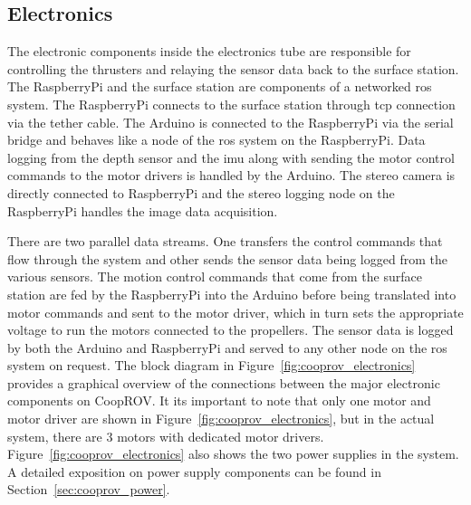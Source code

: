 \documentclass {udthesis}
\begin{document}
\subsection{Electronics}

The electronic components inside the electronics tube are responsible for controlling the thrusters and relaying the sensor data back to the surface station. The RaspberryPi and the surface station are components of a networked \gls{ros} system. The RaspberryPi connects to the surface station through \gls{tcp} connection via the tether cable. The Arduino is connected to the RaspberryPi via the serial bridge and behaves like a node of the \gls{ros} system on the RaspberryPi. Data logging from the depth sensor and the \gls{imu} along with sending the motor control commands to the motor drivers is handled by the Arduino. The stereo camera is directly connected to RaspberryPi and the stereo logging node on the RaspberryPi handles the image data acquisition.

There are two parallel data streams. One transfers the control commands that flow through the system and other sends the sensor data being logged from the various sensors. The motion control commands that come from the surface station are fed by the RaspberryPi into the Arduino before being translated into motor commands and sent to the motor driver, which in turn sets the appropriate voltage to run the motors connected to the propellers. The sensor data is logged by both the Arduino and RaspberryPi and served to any other node on the \gls{ros} system on request. The block diagram in Figure~\ref{fig:cooprov_electronics} provides a graphical overview of the connections between the major electronic components on CoopROV. It its important to note that only one motor and motor driver are shown in Figure~\ref{fig:cooprov_electronics}, but in the actual system, there are 3 motors with dedicated motor drivers. Figure~\ref{fig:cooprov_electronics} also shows the two power supplies in the system. A detailed 
exposition on 
power supply components can be found in Section~\ref{sec:cooprov_power}.
\end{document}
